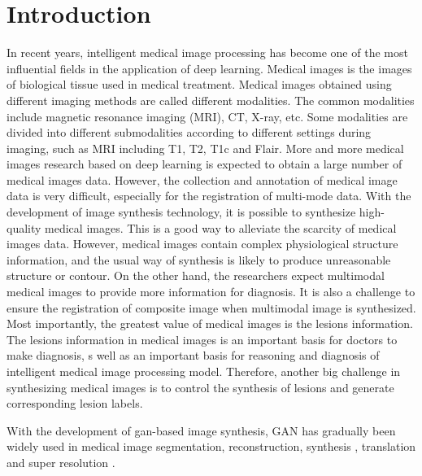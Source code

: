 \documentclass[runningheads]{llncs}
\begin{document}
\section{Introduction}
In recent years, intelligent medical image processing has become one of the most influential fields in the application of deep learning. Medical images is the images of biological tissue used in medical treatment. Medical images obtained using different imaging methods are called different modalities. The common modalities include magnetic resonance imaging (MRI), CT, X-ray, etc. Some modalities are divided into different submodalities according to different settings during imaging, such as MRI including T1, T2, T1c and Flair.
More and more medical images research based on deep learning is expected to obtain a large number of medical images data. However, the collection and annotation of medical image data is very difficult, especially for the registration of multi-mode data. With the development of image synthesis technology, it is possible to synthesize high-quality medical images. This is a good way to alleviate the scarcity of medical images data.
However, medical images contain complex physiological structure information, and the usual way of synthesis is likely to produce unreasonable structure or contour. On the other hand, the researchers expect multimodal medical images to provide more information for diagnosis. It is also a challenge to ensure the registration of composite image when multimodal image is synthesized.
Most importantly, the greatest value of medical images is the lesions information. The lesions information in medical images is an important basis for doctors to make diagnosis, s well as an important basis for reasoning and diagnosis of intelligent medical image processing model. Therefore, another big challenge in synthesizing medical images is to control the synthesis of lesions and generate corresponding lesion labels.


With the development of gan-based image synthesis, GAN has gradually been widely used in medical image segmentation\cite{40kamnitsas2017unsupervised}, reconstruction\cite{61fan2018a,65anirudh2018lose}, synthesis \cite{4shin2018medical,41costa2017towards,43iglesias2013is,44shrivastava2017learning}, translation \cite{2zhang2018translating,20nie2017medical,35osokin2017gans,36vannguyen2015crossdomain,40kamnitsas2017unsupervised,136yi2018sharpness-aware,137yang2018low-dose,138WolterinkGenerative} and super resolution \cite{14You2018CT,15lyu2018super-resolution}. 
\end{document}
